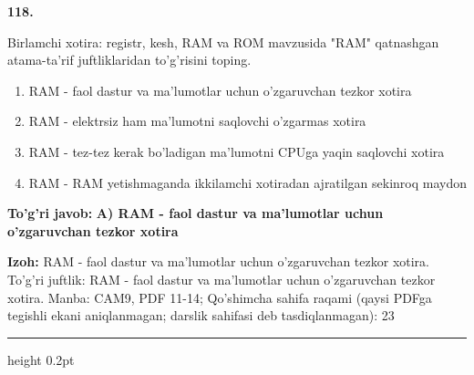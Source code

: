\documentclass[10pt,a4paper]{article}
\begin{document}
{\bfseries\sffamily\color{ink} 118.}
\par
Birlamchi xotira: registr, kesh, RAM va ROM mavzusida "RAM" qatnashgan atama-ta'rif juftliklaridan to'g'risini toping.
\begin{enumerate}[label=\Alph*),leftmargin=9mm]
\item RAM - faol dastur va ma'lumotlar uchun o'zgaruvchan tezkor xotira
\item RAM - elektrsiz ham ma'lumotni saqlovchi o'zgarmas xotira
\item RAM - tez-tez kerak bo'ladigan ma'lumotni CPUga yaqin saqlovchi xotira
\item RAM - RAM yetishmaganda ikkilamchi xotiradan ajratilgan sekinroq maydon
\end{enumerate}
\begin{tcolorbox}[enhanced,breakable,colback=teal!4,colframe=teal!60!black,boxrule=0.45pt,arc=1.2mm,left=2.7mm,right=2.7mm,top=1.8mm,bottom=1.8mm,before skip=2mm,after skip=2mm]
{\bfseries\sffamily\color{teal}To'g'ri javob:} \textbf{A) RAM - faol dastur va ma'lumotlar uchun o'zgaruvchan tezkor xotira}
\par\smallskip
{\bfseries Izoh:} RAM - faol dastur va ma'lumotlar uchun o'zgaruvchan tezkor xotira. To'g'ri juftlik: RAM - faol dastur va ma'lumotlar uchun o'zgaruvchan tezkor xotira. Manba: CAM9, PDF 11-14; Qo'shimcha sahifa raqami (qaysi PDFga tegishli ekani aniqlanmagan; darslik sahifasi deb tasdiqlanmagan): 23
\end{tcolorbox}
\vspace{2mm}\hrule height 0.2pt\vspace{3mm}
\end{document}
